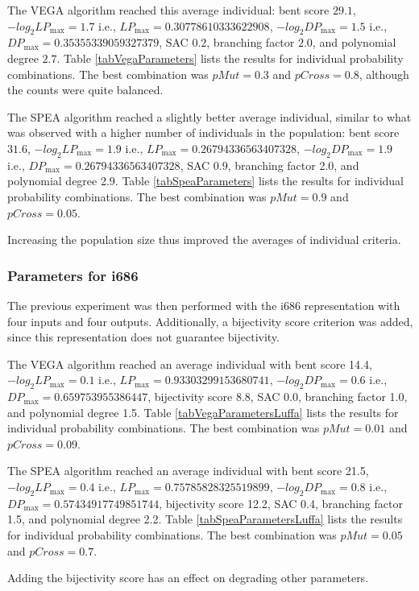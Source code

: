 The VEGA algorithm reached this average individual:
bent score $29.1$,
$-log_2{LP_{\max}} = 1.7$ i.e., $LP_{\max} = 0.30778610333622908$,
$-log_2{DP_{\max}} = 1.5$ i.e., $DP_{\max} = 0.35355339059327379$,
SAC $0.2$,
branching factor $2.0$,
and polynomial degree $2.7$.
Table \ref{tabVegaParameters} lists the results for individual probability combinations.
The best combination was $pMut = 0.3$ and $pCross = 0.8$, although the counts were quite balanced.

The SPEA algorithm reached a slightly better average individual, similar to what was observed with a higher number
of individuals in the population:
bent score $31.6$,
$-log_2{LP_{\max}} = 1.9$ i.e., $LP_{\max} = 0.26794336563407328$,
$-log_2{DP_{\max}} = 1.9$ i.e., $DP_{\max} = 0.26794336563407328$,
SAC $0.9$,
branching factor 2.0,
and polynomial degree 2.9.
Table \ref{tabSpeaParameters} lists the results for individual probability combinations.
The best combination was $pMut = 0.9$ and $pCross = 0.05$.

Increasing the population size thus improved the averages of individual criteria.

\subsubsection{Parameters for i686}
The previous experiment was then performed with the i686 representation with four inputs
and four outputs. Additionally, a bijectivity score criterion was added,
since this representation does not guarantee bijectivity.

The VEGA algorithm reached an average individual with
bent score 14.4,
$-log_2{LP_{\max}} = 0.1$ i.e., $LP_{\max} = 0.93303299153680741$,
$-log_2{DP_{\max}} = 0.6$ i.e., $DP_{\max} = 0.659753955386447$,
bijectivity score 8.8,
SAC 0.0,
branching factor 1.0,
and polynomial degree 1.5.
Table \ref{tabVegaParametersLuffa} lists the results for individual probability combinations.
The best combination was $pMut = 0.01$ and $pCross = 0.09$.

The SPEA algorithm reached an average individual with
bent score 21.5,
$-log_2{LP_{\max}} = 0.4$ i.e., $LP_{\max} = 0.75785828325519899$,
$-log_2{DP_{\max}} = 0.8$ i.e., $DP_{\max} =  0.57434917749851744$,
bijectivity score 12.2,
SAC 0.4,
branching factor 1.5,
and polynomial degree 2.2.
Table \ref{tabSpeaParametersLuffa} lists the results for individual probability combinations.
The best combination was $pMut = 0.05$ and $pCross = 0.7$.

Adding the bijectivity score has an effect on degrading other parameters.

